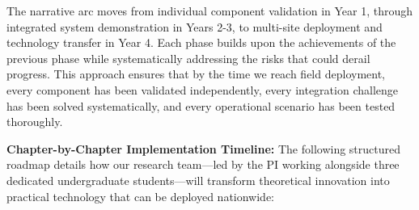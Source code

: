 \documentclass[12pt]{article}
\begin{document}
The narrative arc moves from individual component validation in Year 1, through integrated system demonstration in Years 2-3, to multi-site deployment and technology transfer in Year 4. Each phase builds upon the achievements of the previous phase while systematically addressing the risks that could derail progress. This approach ensures that by the time we reach field deployment, every component has been validated independently, every integration challenge has been solved systematically, and every operational scenario has been tested thoroughly.

\textbf{Chapter-by-Chapter Implementation Timeline:} The following structured roadmap details how our research team—led by the PI working alongside three dedicated undergraduate students—will transform theoretical innovation into practical technology that can be deployed nationwide:
\end{document}
